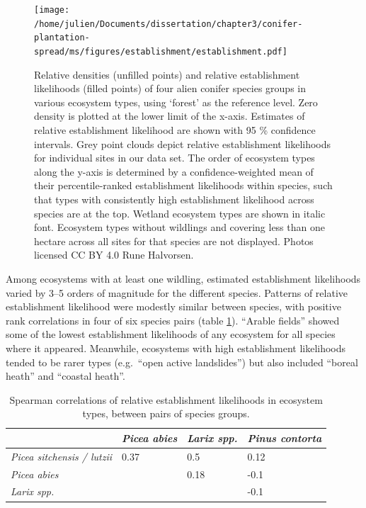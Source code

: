 \documentclass[
]{article}
\begin{document}
\newpage
\begin{landscape}

\begin{figure}
\centering
\texttt{[image: /home/julien/Documents/dissertation/chapter3/conifer-plantation-spread/ms/figures/establishment/establishment.pdf]}
\caption{\label{fig:establishment}Relative densities (unfilled points) and relative establishment likelihoods (filled points) of four alien conifer species groups in various ecosystem types, using `forest' as the reference level. Zero density is plotted at the lower limit of the x-axis. Estimates of relative establishment likelihood are shown with 95 \% confidence intervals. Grey point clouds depict relative establishment likelihoods for individual sites in our data set. The order of ecosystem types along the y-axis is determined by a confidence-weighted mean of their percentile-ranked establishment likelihoods within species, such that types with consistently high establishment likelihood across species are at the top. Wetland ecosystem types are shown in italic font. Ecosystem types without wildlings and covering less than one hectare across all sites for that species are not displayed. Photos licensed CC BY 4.0 Rune Halvorsen.}
\end{figure}

\end{landscape}
\newpage

Among ecosystems with at least one wildling, estimated establishment likelihoods varied by 3--5 orders of magnitude for the different species.
Patterns of relative establishment likelihood were modestly similar between species, with positive rank correlations in four of six species pairs (table \ref{tab:species-correlation-table}).
``Arable fields'' showed some of the lowest establishment likelihoods of any ecosystem for all species where it appeared.
Meanwhile, ecosystems with high establishment likelihoods tended to be rarer types (e.g.~``open active landslides'') but also included ``boreal heath'' and ``coastal heath''.

\begin{table}

\caption{\label{tab:species-correlation-table}Spearman correlations of relative establishment likelihoods in ecosystem types, between pairs of species groups.}
\centering
\begin{tabular}[t]{>{}llll}
\toprule
\em{ } & \em{Picea abies} & \em{Larix spp.} & \em{Pinus contorta}\\
\midrule
\em{Picea sitchensis / lutzii} & 0.37 & 0.5 & 0.12\\
\em{Picea abies} &  & 0.18 & -0.1\\
\em{Larix spp.} &  &  & -0.1\\
\bottomrule
\end{tabular}
\end{table}
\end{document}
